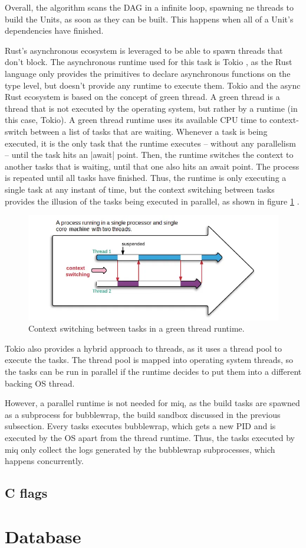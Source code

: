 Overall, the algorithm scans the \ac{DAG} in a infinite
loop, spawning ne threads to build the Units, as soon as
they can be built. This happens when all of a Unit's
dependencies have finished.

Rust's asynchronous ecosystem is leveraged to be able to
spawn threads that don't block. The asynchronous runtime
used for this task is Tokio \cite{TokioRust}, as the Rust
language only provides the primitives to declare
asynchronous functions on the type level, but doesn't
provide any runtime to execute them. Tokio and the async
Rust ecosystem is based on the concept of green thread. A
green thread is a thread that is not executed by the
operating system, but rather by a runtime (in this case,
Tokio). A green thread runtime uses its available CPU time
to context-switch between a list of tasks that are waiting.
Whenever a task is being executed, it is the only task that
the runtime executes -- without any parallelism -- until the
task hits an |await| point. Then, the runtime switches the
context to another tasks that is waiting, until that one
also hits an await point. The process is repeated until all
tasks have finished. Thus, the runtime is only executing a
single task at any instant of time, but the context
switching between tasks provides the illusion of the tasks
being executed in parallel, as shown in figure \ref{fig:timeshare} .

\begin{figure}[hbt]
    \centerfloat
    \includegraphics[width=350pt]{assets/timeshare.png}
    \caption{Context switching between tasks in a green thread runtime.}
    \label{fig:timeshare}
\end{figure}

Tokio also provides a hybrid approach to threads, as it uses
a thread pool to execute the tasks. The thread pool is
mapped into operating system threads, so the tasks can be
run in parallel if the runtime decides to put them into a
different backing \ac{OS} thread.

However, a parallel runtime is not needed for miq, as the
build tasks are spawned as a subprocess for bubblewrap, the
build sandbox discussed in the previous subsection. Every
tasks executes bubblewrap, which gets a new \acl{PID} and is
executed by the OS apart from the thread runtime. Thus, the
tasks executed by miq only collect the logs generated by the
bubblewrap subprocesses, which happens concurrently.


\FloatBarrier
\subsection{C flags}

\section{Database}
